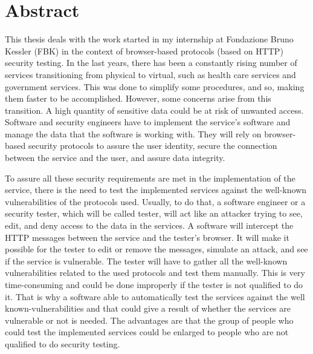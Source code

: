 \chapter*{Abstract} %

This thesis deals with the work started in my internship at Fondazione Bruno Kessler (FBK) in the context of browser-based protocols (based on HTTP) security testing.
In the last years, there has been a constantly rising number of services transitioning from physical to virtual, such as health care services and government services. This was done to simplify some procedures, and so, making them faster to be accomplished. However, some concerns arise from this transition. A high quantity of sensitive data could be at risk of unwanted access. Software and security engineers have to implement the service's software and manage the data that the software is working with. They will rely on browser-based security protocols to assure the user identity, secure the connection between the service and the user, and assure data integrity. 

To assure all these security requirements are met in the implementation of the service, there is the need to test the implemented services against the well-known vulnerabilities of the protocols used. Usually, to do that, a software engineer or a security tester, which will be called tester, will act like an attacker trying to see, edit, and deny access to the data in the services. A software will intercept the HTTP messages between the service and the tester's browser. It will make it possible for the tester to edit or remove the messages, simulate an attack, and see if the service is vulnerable. The tester will have to gather all the well-known vulnerabilities related to the used protocols and test them manually. This is very time-consuming and could be done improperly if the tester is not qualified to do it. That is why a software able to automatically test the services against the well known-vulnerabilities and that could give a result of whether the services are vulnerable or not is needed. The advantages are that the group of people who could test the implemented services could be enlarged to people who are not qualified to do security testing.

